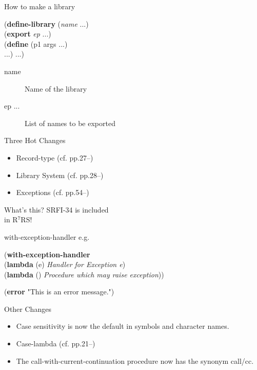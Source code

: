 \documentclass[dvipdfm,12pt,fleqn]{beamer}
\begin{document}
\begin{frame}{How to make a library}
\begin{screen}
(\textbf{define-library} (\textit{name} ...)\\
\hspace{1em}(\textbf{export} \textit{ep} ...)\\
\hspace{1em}(\textbf{define} (p1 args ...)\\
\hspace{2em}...) ...)\\
\end{screen}

\begin{description}
\item[name]Name of the library
\item[ep ...]List of names to be exported
\end{description}
\end{frame}

\begin{frame}{Three Hot Changes\footnotemark[1]}
\huge
\begin{itemize}
\item Record-type (cf. pp.27--)
\item Library System (cf. pp.28--)
\item \alert{Exceptions} (cf. pp.54--)
\end{itemize}
\end{frame}

\begin{frame}{What's this?}
\Huge
SRFI-34 is \alert{included}\\
in R$^7$RS!
\end{frame}

\begin{frame}{with-exception-handler}
e.g.
\begin{screen}
(\textbf{with-exception-handler}\\
\hspace{1em}(\textbf{lambda} (e) \textit{Handler for Exception e})\\
\hspace{1em}(\textbf{lambda} () \textit{Procedure which may raise exception}))
\end{screen}
\begin{screen}
(\textbf{error} "This is an error message.")
\end{screen}
\end{frame}

\begin{frame}{Other Changes}
\Large
\begin{itemize}
\pause\item Case sensitivity is now the default in symbols and character names.
\pause\item Case-lambda (cf. pp.21--)
\pause\item The call-with-current-continuation procedure now has the synonym call/cc.
\end{itemize}
\end{frame}
\end{document}
